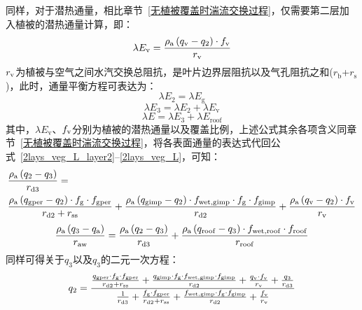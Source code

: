 同样，对于潜热通量，相比章节~\ref{无植被覆盖时湍流交换过程}，仅需要第二层加入植被的潜热通量计算，即：
\begin{equation}
  \lambda E_{\mathrm{v}} = \frac{\rho _{\rm a} \left( q_{\mathrm{v}}-q_{2}\right) \cdot f_{\rm v}}{r_{\mathrm{v}}}
\end{equation}
$r_{\rm v}$为植被与空气之间水汽交换总阻抗，是叶片边界层阻抗以及气孔阻抗之和($r_{\mathrm{b}}$+$r_{\mathrm{s}}$)，此时，通量平衡方程可表达为：
\begin{equation}\label{2lays_veg_L_layer2}
  \lambda E_{2} = \lambda E_{\mathrm{g}}
\end{equation}
%
\begin{equation}
  \lambda E_{3} = \lambda E_{2} + \lambda E_{\mathrm{v}}
\end{equation}
%
\begin{equation}\label{2lays_veg_L}
  \lambda E = \lambda E_{3} + \lambda E_{\mathrm{roof}}
\end{equation}
其中，$\lambda E_{\mathrm{v}}$、$f_{\rm v}$分别为植被的潜热通量以及覆盖比例，上述公式其余各项含义同章节~\ref{无植被覆盖时湍流交换过程}，将各表面通量的表达式代回公式~\eqref{2lays_veg_L_layer2}--\eqref{2lays_veg_L}，可知：
\begin{equation}
  \begin{split}
    & \frac{\rho _{\rm a} \left( q_{2}-q_{3}\right)}{r_{\mathrm{d3}}} = \\
    & \frac{\rho _{\rm a} \left( q_{\mathrm{gper}}-q_{\mathrm{2}}\right) \cdot f_{\mathrm{g}} \cdot f_{\mathrm{gper}}}{r_{\mathrm{d2}}+r_{\mathrm{ss}}} + \frac{\rho _{\rm a} \left( q_{\mathrm{gimp}}-q_{2} \right) \cdot f_{\mathrm{wet,gimp}} \cdot f_{\mathrm{g}} \cdot f_{\mathrm{gimp}}}{r_{\mathrm{d2}}} + \frac{\rho _{\rm a} \left( q_{\mathrm{v}}-q_{2}\right) \cdot f_{\rm v}}{r_{\mathrm{v}}}
  \end{split}
\end{equation}
%
\begin{equation}
  \frac{\rho _{\rm a} \left( q_{3} - q_{\rm a}\right)}{r_{\mathrm{aw}}} = \frac{\rho _{\rm a} \left( q_{2} - q_{3}\right)}{r_{\mathrm{d3}}} + \frac{\rho _{\rm a} \left( q_{\mathrm{roof}}-q_{3}\right) \cdot f_{\mathrm{wet,roof}} \cdot f_{\mathrm{roof}}}{r_{\mathrm{roof}}}
\end{equation}
同样可得关于$q_{3}$以及$q_{3}$的二元一次方程：
\begin{equation}
  q_{2} = \\
  \frac{\frac{q_{\mathrm{gper}} \cdot f_{\mathrm{g}} \cdot f_{\mathrm{gper}}}{r_{\mathrm{d2}} + r_{\mathrm{ss}}} + \frac{q_{\mathrm{gimp}} \cdot f_{\mathrm{g}} \cdot f_{\mathrm{wet,gimp}} \cdot f_{\mathrm{gimp}}}{r_{\mathrm{d2}}} + \frac{q_{\mathrm{v}} \cdot f_{\rm v}}{r_{\mathrm{v}}} + \frac{q_{3}}{r_{\mathrm{d3}}}}{\frac{1}{r_{\mathrm{d3}}} + \frac{f_{\mathrm{g}} \cdot f_{\mathrm{gper}}}{r_{\mathrm{d2}} + r_{\mathrm{ss}}} + \frac{f_{\mathrm{wet,gimp}} \cdot f_{\mathrm{g}} \cdot f_{\mathrm{gimp}}}{r_{\mathrm{d2}}}+\frac{f_{\rm v}}{r_{\mathrm{v}}}}
\end{equation}
